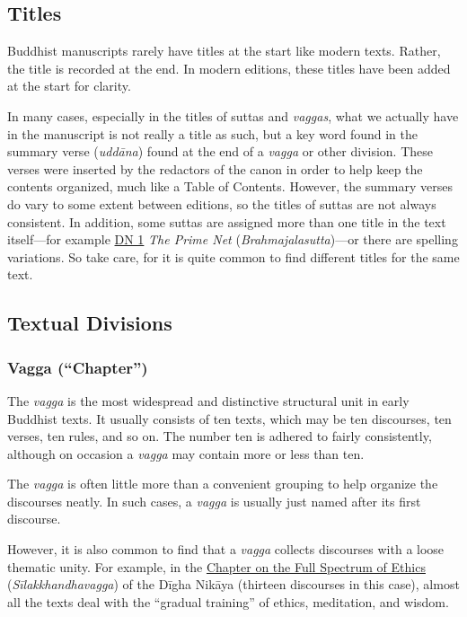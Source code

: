 \documentclass[12pt,openany]{book}%
\begin{document}
\subsection*{Titles}

Buddhist manuscripts rarely have titles at the start like modern texts. Rather, the title is recorded at the end. In modern editions, these titles have been added at the start for clarity.

In many cases, especially in the titles of suttas and \textit{vaggas}, what we actually have in the manuscript is not really a title as such, but a key word found in the summary verse (\textit{\textsanskrit{uddāna}}) found at the end of a \textit{vagga} or other division. These verses were inserted by the redactors of the canon in order to help keep the contents organized, much like a Table of Contents. However, the summary verses do vary to some extent between editions, so the titles of suttas are not always consistent. In addition, some suttas are assigned more than one title in the text itself—for example \href{/dn1}{DN 1} \textit{The Prime Net} (\textit{Brahmajalasutta})—or there are spelling variations. So take care, for it is quite common to find different titles for the same text.

\subsection*{Textual Divisions}

\subsubsection*{Vagga (“Chapter”)}

The \textit{vagga} is the most widespread and distinctive structural unit in early Buddhist texts. It usually consists of ten texts, which may be ten discourses, ten verses, ten rules, and so on. The number ten is adhered to fairly consistently, although on occasion a \textit{vagga} may contain more or less than ten.

The \textit{vagga} is often little more than a convenient grouping to help organize the discourses neatly. In such cases, a \textit{vagga} is usually just named after its first discourse.

However, it is also common to find that a \textit{vagga} collects discourses with a loose thematic unity. For example, in the \href{dn{-}silakkhandhavagga}{Chapter on the Full Spectrum of Ethics} (\textit{\textsanskrit{Sīlakkhandhavagga}}) of the \textsanskrit{Dīgha} \textsanskrit{Nikāya} (thirteen discourses in this case), almost all the texts deal with the “gradual training” of ethics, meditation, and wisdom.
\end{document}
